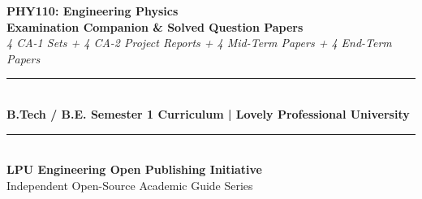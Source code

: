 \begin{titlepage}
\centering
\vspace*{1.5cm}
{\Huge \textbf{\color{LPUNavy}PHY110: Engineering Physics}}\\[0.5cm]
{\LARGE \textbf{\color{LPUOrange}Examination Companion \& Solved Question Papers}}\\[0.3cm]
{\large \textit{4 CA-1 Sets + 4 CA-2 Project Reports + 4 Mid-Term Papers + 4 End-Term Papers}}\\[2cm]

\rule{\linewidth}{1.5pt}\\[0.5cm]
{\large \textbf{B.Tech / B.E. Semester 1 Curriculum | Lovely Professional University}}\\[0.5cm]
\rule{\linewidth}{1.5pt}\\[2.5cm]

\vfill
{\large \textbf{LPU Engineering Open Publishing Initiative}}\\[0.2cm]
{\small Independent Open-Source Academic Guide Series}
\end{titlepage}
\newpage
